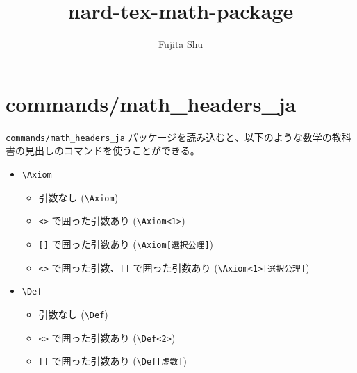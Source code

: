 \documentclass[oneside,10pt,a4paper]{jsarticle}
\title{nard-tex-math-package}
\author{Fujita Shu}
\begin{document}
  \maketitle

  \section{commands/math\_headers\_ja}

  \verb|commands/math_headers_ja| パッケージを読み込むと、以下のような数学の教科書の見出しのコマンドを使うことができる。

  \begin{itemize}
    \item \verb|\Axiom|
      \begin{itemize}
        \item 引数なし (\verb|\Axiom|)
          \begin{quote}
            \Axiom
          \end{quote}
        \item \verb|<>| で囲った引数あり (\verb|\Axiom<1>|)
          \begin{quote}
          \end{quote}
        \item \verb|[]| で囲った引数あり (\verb|\Axiom[選択公理]|)
          \begin{quote}
            \Axiom[選択公理]
          \end{quote}
        \item \verb|<>| で囲った引数、\verb|[]| で囲った引数あり (\verb|\Axiom<1>[選択公理]|)
          \begin{quote}
          \end{quote}
      \end{itemize}
    \item \verb|\Def|
      \begin{itemize}
        \item 引数なし (\verb|\Def|)
          \begin{quote}
            \Def
          \end{quote}
        \item \verb|<>| で囲った引数あり (\verb|\Def<2>|)
          \begin{quote}
          \end{quote}
        \item \verb|[]| で囲った引数あり (\verb|\Def[虚数]|)
          \begin{quote}

\end{quote}
\end{itemize}
\end{itemize}
\end{document}
